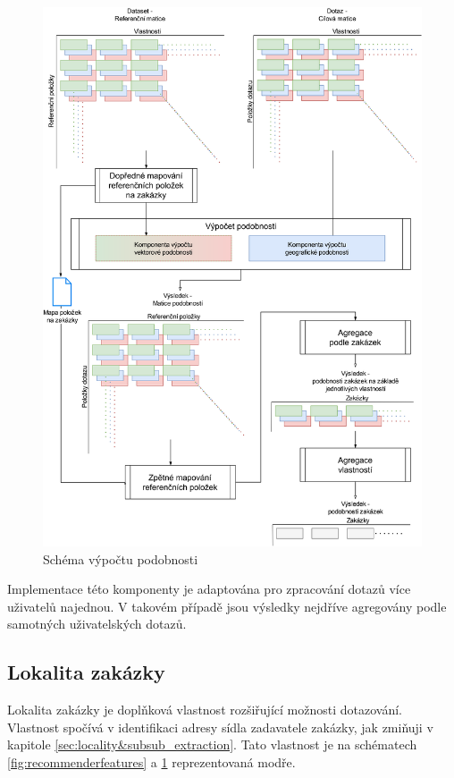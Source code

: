 \documentclass[thesis=M,czech]{FITthesis}[2019/12/23]
\begin{document}
\begin{figure}\centering
	\includegraphics[width=\textwidth]{images/recommender_algorithm.png}
	\caption{Schéma výpočtu podobnosti}\label{fig:recommender_algorithm}
\end{figure}

Implementace této komponenty je adaptována pro zpracování dotazů více uživatelů najednou. V takovém případě jsou výsledky nejdříve agregovány podle samotných uživatelských dotazů.

\subsection{Lokalita zakázky}
\label{sec:feature_locality}

Lokalita zakázky je doplňková vlastnost rozšiřující možnosti dotazování. Vlastnost spočívá v identifikaci adresy sídla zadavatele zakázky, jak zmiňuji v kapitole \ref{sec:locality&subsub_extraction}. Tato vlastnost je na schématech \ref{fig:recommenderfeatures} a \ref{fig:recommender_algorithm} reprezentovaná modře.
\end{document}
